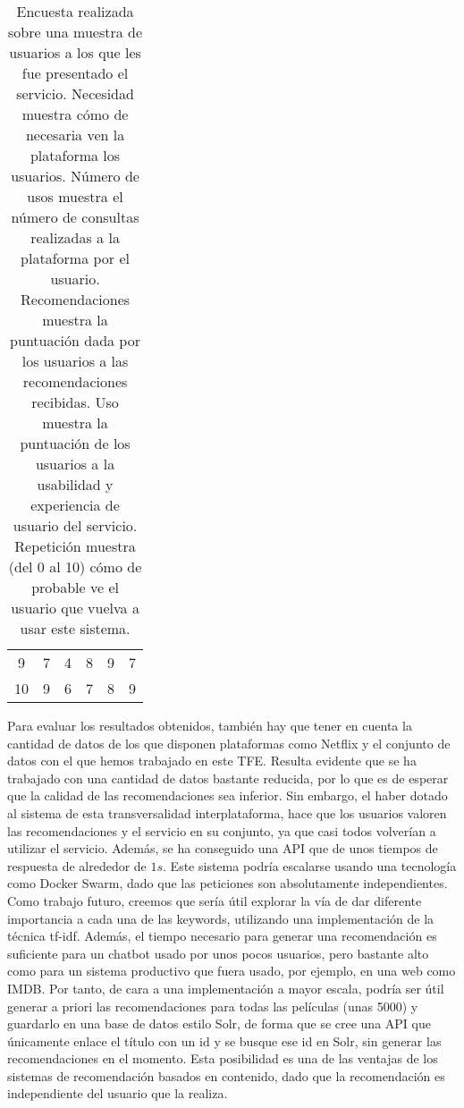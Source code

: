 \begin{table}[H]
{\begin{tabular}{cccccc}
9                                     & 7                                       & 4                                            & 8                                             & 9                                 & 7                                       \\
10                                    & 9                                       & 6                                            & 7                                             & 8                                 & 9                                      
\end{tabular}%
}
\caption{Encuesta realizada sobre una muestra de usuarios a los que les fue presentado el servicio. Necesidad muestra cómo de necesaria ven la plataforma los usuarios. Número de usos muestra el número de consultas realizadas a la plataforma por el usuario. Recomendaciones muestra la puntuación dada por los usuarios a las recomendaciones recibidas. Uso muestra la puntuación de los usuarios a la usabilidad y experiencia de usuario del servicio. Repetición muestra (del 0 al 10) cómo de probable ve el usuario que vuelva a usar este sistema.}
\label{tab:satisfaction}
\end{table}

Para evaluar los resultados obtenidos, también hay que tener en cuenta la cantidad de datos de los que disponen plataformas como Netflix y el conjunto de datos con el que hemos trabajado en este TFE. Resulta evidente que se ha trabajado con una cantidad de datos bastante reducida, por lo que es de esperar que la calidad de las recomendaciones sea inferior. Sin embargo, el haber dotado al sistema de esta transversalidad interplataforma, hace que los usuarios valoren las recomendaciones y el servicio en su conjunto, ya que casi todos volverían a utilizar el servicio. Además, se ha conseguido una API que de unos tiempos de respuesta de alrededor de $1 s$. Este sistema podría escalarse usando una tecnología como Docker Swarm, dado que las peticiones son absolutamente independientes.\\

Como trabajo futuro, creemos que sería útil explorar la vía de dar diferente importancia a cada una de las keywords, utilizando una implementación de la técnica tf-idf. Además, el tiempo necesario para generar una recomendación es suficiente para un chatbot usado por unos pocos usuarios, pero bastante alto como para un sistema productivo que fuera usado, por ejemplo, en una web como IMDB. Por tanto, de cara a una implementación a mayor escala, podría ser útil generar a priori las recomendaciones para todas las películas (unas 5000) y guardarlo en una base de datos estilo Solr, de forma que se cree una API que únicamente enlace el título con un id y se busque ese id en Solr, sin generar las recomendaciones en el momento. Esta posibilidad es una de las ventajas de los sistemas de recomendación basados en contenido, dado que la recomendación es independiente del usuario que la realiza.

